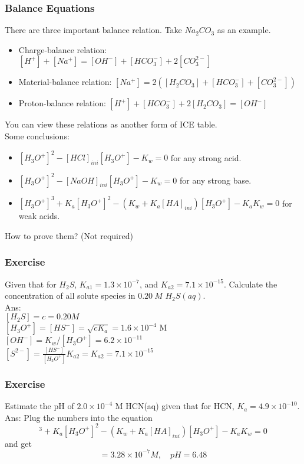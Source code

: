 \documentclass[aspectratio=169]{beamer}
\def\blankline{\\[12pt]}
\begin{document}
\begin{frame}
  \frametitle{Balance Equations}
  There are three important balance relation. Take $Na_2CO_3$ as an example.
  \begin{itemize}
    \item Charge-balance relation: $[H^+] + [Na^+] = [OH^-] + [HCO_3^{-}] + 2[CO_3^{2-}]$
    \item Material-balance relation: $[Na^+] = 2([H_2CO_3] + [HCO_3^{-}] + [CO_3^{2-}])$
    \item Proton-balance relation: $[H^+] + [HCO_3^{-}] + 2[H_2CO_3] = [OH^-]$ 
  \end{itemize}
  You can view these relations as another form of ICE table. \\
  Some conclusions:
  \begin{itemize}
    \item $[H_3O^+]^2 - [HCl]_{ini}[H_3O^+] - K_w = 0$ for any strong acid.
    \item $[H_3O^+]^2 - [NaOH]_{ini}[H_3O^+] - K_w = 0$ for any strong base.
    \item $[H_3O^+]^3 + K_a [H_3O^+]^2 - (K_w + K_a[HA]_{ini})[H_3O^+] - K_aK_w = 0$ for weak acids. 
  \end{itemize}
  How to prove them? (Not required)
\end{frame}
\begin{frame}
  \frametitle{Exercise}
  Given that for $H_2S$, $K_{a1} = 1.3\times 10^{-7}$, and $K_{a2} = 7.1\times 10^{-15}$. Calculate the 
  concentration of all solute species in $0.20\ M$ $H_2S(aq)$.
  \pause
  \blankline
  Ans: \\
  $[H_2S] = c = 0.20 M$ \\
  $[H_3O^+] = [HS^-] = \sqrt{cK_a} = 1.6\times 10^{-4}$ M \\
  $[OH^-] = K_w/[H_3O^+] = 6.2\times 10^{-11}$ \\
  $[S^{2-}] = \frac{[HS^-]}{[H_3O^+]}K_{a2} = K_{a2} = 7.1\times 10^{-15}$
\end{frame}
\begin{frame}
  \frametitle{Exercise}
  Estimate the pH of $2.0\times 10^{-4}$ M HCN(aq) given that for HCN, $K_a = 4.9\times 10^{-10}$.
  \pause
  \blankline
  Ans: Plug the numbers into the equation
  \begin{equation*}
    [H_3O^+]^3 + K_a [H_3O^+]^2 - (K_w + K_a[HA]_{ini})[H_3O^+] - K_aK_w = 0
  \end{equation*}
  and get
  \begin{equation*}
    [H_3O^+] = 3.28\times 10^{-7} M, \quad pH = 6.48
  \end{equation*}
\end{frame}
\end{document}
